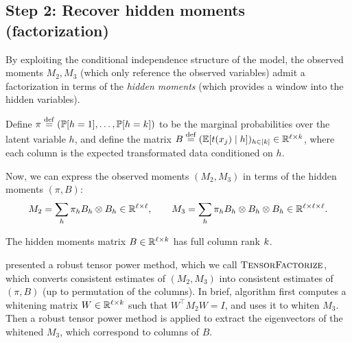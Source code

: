 \subsection{Step 2: Recover hidden moments (factorization)}
\label{sec:factorization}

By exploiting the conditional independence structure of the model, the observed
moments $M_2,M_3$ (which only reference the observed variables) admit a
factorization in terms of the \emph{hidden moments}
(which provides a window into the hidden variables).

Define
$\pi \stackrel{\rm def}{=} (\mathbb{P}[h=1], \dots, \mathbb{P}[h=k])$ to be the marginal probabilities over the latent variable $h$,
and define the matrix $B \stackrel{\rm def}{=} (\mathbb{E}[t(x_j) \mid h])_{h \in [k]} \in \mathbb{R}^{\ell \times k}$,
where each column is the expected transformated data conditioned on $h$.

Now, we can express the observed moments $(M_2,M_3)$ in terms of the hidden moments $(\pi,B)$:
\begin{align}
  M_2 = \sum_h \pi_h B_h \otimes B_h \in \mathbb{R}^{\ell \times \ell}, \quad\quad
  M_3 = \sum_h \pi_h B_h \otimes B_h \otimes B_h \in \mathbb{R}^{\ell \times \ell \times \ell}.
\end{align}
\begin{assumption}
  The hidden moments matrix $B \in \mathbb{R}^{\ell \times k}$ has full column rank $k$.
\end{assumption}

\citep{anandkumar13tensor} presented a robust tensor power method, which we call $\text{\sc TensorFactorize}$,
which converts consistent estimates of $(M_2,M_3)$ into consistent estimates of $(\pi, B)$ (up to permutation of the columns).
In brief, algorithm first computes a whitening matrix $W \in \mathbb{R}^{\ell \times k}$ such that $W^\top M_2 W = I$,
and uses it to whiten $M_3$.  Then a robust tensor power method is applied to extract the eigenvectors of the whitened $M_3$,
which correspond to columns of $B$.

